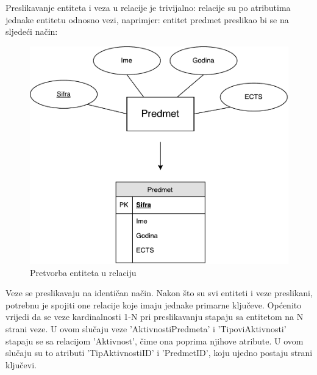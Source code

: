 \documentclass[times, utf8, zavrsni]{fer}
\begin{document}
Preslikavanje entiteta i veza u relacije je trivijalno: relacije su po atributima jednake entitetu odnosno vezi, naprimjer: entitet predmet preslikao bi se na sljedeći način:\\

\begin{figure}[H]
\centering
\includegraphics[width=\textwidth,height=\textheight,keepaspectratio]{img/relacija-predmet.pdf}
\caption{Pretvorba entiteta u relaciju}
\label{fig:relacija-predmet}
\end{figure}

Veze se preslikavaju na identičan način.
Nakon što su svi entiteti i veze preslikani, potrebnu je spojiti one relacije koje imaju jednake primarne ključeve. Općenito vrijedi da se veze kardinalnosti 1-N pri preslikavanju stapaju sa entitetom na N strani veze. U ovom slučaju veze 'AktivnostiPredmeta' i 'TipoviAktivnosti' stapaju se sa relacijom 'Aktivnost', čime ona poprima njihove atribute. U ovom slučaju su to atributi 'TipAktivnostiID' i 'PredmetID', koju ujedno postaju strani ključevi.\\
\end{document}
